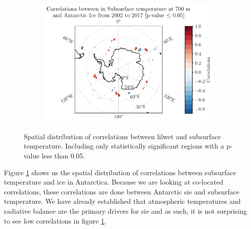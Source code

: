 \documentclass[../main.tex]{subfiles}
\begin{document}
\begin{figure}[hbt!]
\begin{subfigure}[b]{0.45\textwidth}
    \includegraphics[width=\textwidth]{images/2021w5/chapter7/hres/correlation_spatial_subsurtemp_700}
    \end{subfigure}
    \caption{Spatial distribution of correlations between \gls{lilwet} and subsurface temperature. Including only statistically significant regions with a p-value less than 0.05.}
    \label{fig:correlation_spatial_subsurtemp_100}
\end{figure}

Figure \ref{fig:correlation_spatial_subsurtemp_100} shows us the spatial distribution of correlations between subsurface temperature and ice in Antarctica.  Because we are looking at co-located correlations, these correlations are done between Antarctic \gls{sie} and subsurface temperature. We have already established that atmospheric temperatures and radiative balance are the primary drivers for \gls{sie} and as such, it is not surprising to see low correlations in figure \ref{fig:correlation_spatial_subsurtemp_100}.
\end{document}
